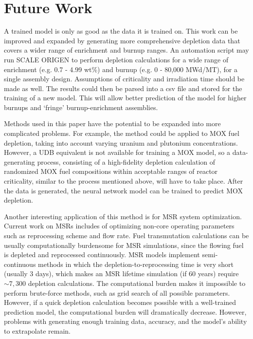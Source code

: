 \section{Future Work}

A trained model is only as good as the data it is trained on.
This work can be improved and expanded by generating
more comprehensive depletion data that covers a wider
range of enrichment and burnup ranges. An automation
script may run SCALE ORIGEN to perform depletion calculations
for a wide range of enrichment (e.g. 0.7 - 4.99 wt\%) and burnup (e.g. 0 - 80,000 MWd/MT),
for a single assembly design. Assumptions of criticality
and irradiation time should be made as well. The results
could then be parsed into a csv file and stored for
the training of a new model. This will allow better
prediction of the model for higher burnups and `fringe'
burnup-enrichment assemblies.

Methods used in this paper have the potential to be expanded into more
complicated problems. For example, the method
could be applied to \gls{MOX} fuel depletion, taking
into account varying uranium and plutonium concentrations.
However, a \gls{UDB} equivalent is not available
for training a \gls{MOX} model, so a
data-generating process, consisting of a high-fidelity
depletion calculation of randomized \gls{MOX} fuel
compositions within acceptable ranges of reactor
criticality, similar to the process mentioned above,
will have to take place. After the data
is generated, the neural network model can be trained
to predict \gls{MOX} depletion.

Another interesting application of this method is for
\gls{MSR} system optimization. Current work on
\glspl{MSR} includes of optimizing non-core operating
parameters such as reprocessing scheme and flow rate.
Fuel transmutation calculations
can be usually computationally burdensome for \gls{MSR}
simulations, since the flowing fuel is depleted and
reprocessed continuously. \gls{MSR} models implement semi-continuous
methods in which the depletion-to-reprocessing time is
very short (usually 3 days), which makes an
\gls{MSR} lifetime simulation (if 60 years)
require $\sim 7,300$ depletion calculations.
The computational burden
makes it impossible to perform brute-force methods,
such as grid search of all possible parameters.
However, if a quick depletion calculation becomes possible
with a well-trained prediction model, the
computational burden will dramatically decrease.
However, problems with generating enough
training data, accuracy, and the model's ability to
extrapolate remain.